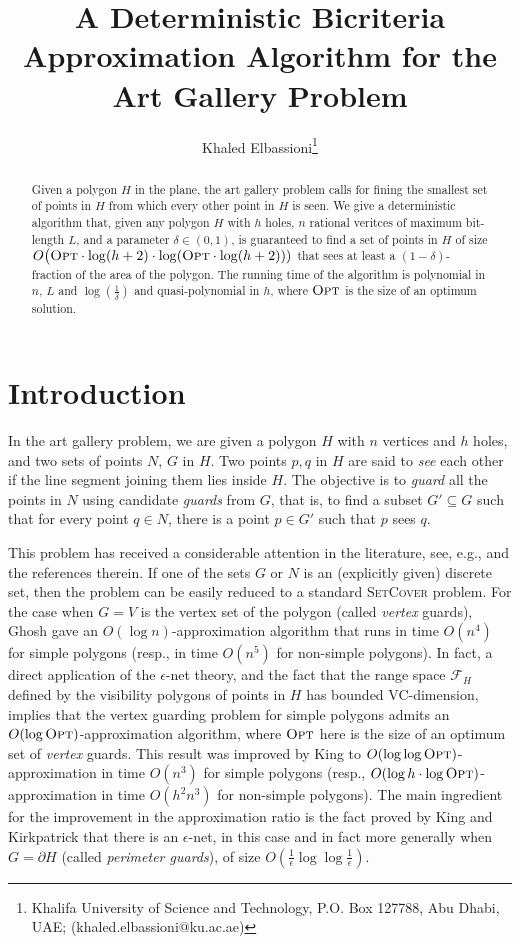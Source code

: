 \documentclass[a4paper,11pt]{article}
\title{A Deterministic Bicriteria Approximation Algorithm for  the Art Gallery Problem
}
\author{
	Khaled Elbassioni\thanks{Khalifa University of Science and Technology, P.O. Box 127788, Abu Dhabi, UAE;
		(khaled.elbassioni@ku.ac.ae)}
}
\date{}
\def\cF{\mathcal F}
\def \OPT {\textsc{Opt}}
\begin{document}
	
\maketitle


\begin{abstract}
 Given a polygon $H$ in the plane, the art gallery problem calls for fining the smallest set of points in  $H$ from which every other point in $H$ is seen. We give a deterministic algorithm that, given any polygon $H$ with $h$ holes, $n$ rational veritces of maximum bit-length $L$, and a parameter $\delta \in(0,1)$, is guaranteed to find a set of points in $H$ of size $O\big(\OPT\cdot\log(h+2)\cdot\log (\OPT\cdot\log(h+2)))$ that sees at least a  $(1-\delta)$-fraction of the area of the polygon. The running time of the algorithm is polynomial in $n$, $L$ and $\log(\frac{1}{\delta})$ and quasi-polynomial in $h$, where $\OPT$ is the size of an optimum solution.
\end{abstract}

\section{Introduction}

In the art gallery problem, we are given a polygon $H$ with $n$ vertices and  $h$ holes, and two sets of points $N$, $G$ in $H$. 
Two points $p,q$ in $H$ are said to {\it see} each other if the line segment joining them lies inside $H$. The objective is to {\it guard} all the points in $N$ using candidate {\it guards} from $G$, that is, to 
find a subset $G'\subseteq G$ such that for every point $q\in N$, there is a point $p\in G'$ such that $p$ sees $q$.

This problem has received a considerable attention in the literature, see, e.g., \cite{BCKO08,O87} and the references therein. If one of the sets $G$ or $N$ is an (explicitly given) discrete set, then the problem can be easily reduced to a standard \textsc{SetCover} problem. For the case when $G=V$ is the vertex set of the polygon (called {\it vertex} guards), Ghosh \cite{G87, G10} gave an $O(\log n)$-approximation algorithm that runs in time $O(n^4)$ for simple polygons (resp., in time $O(n^5)$ for non-simple polygons). In fact, a direct application of the $\epsilon$-net theory, and the fact that the range space $\cF_H$ defined by the visibility polygons of points in $H$ has bounded VC-dimension, implies that the vertex guarding problem for simple polygons admits an $O(\log\OPT)$-approximation algorithm, where $\OPT$ here is the size of an optimum set of {\it vertex} guards.  This result was improved by King \cite{K13} to $O(\log\log\OPT)$-approximation in time $O(n^3)$ for simple polygons (resp.,  $O(\log h\cdot\log\OPT)$-approximation in time $O(h^2n^3)$ for non-simple polygons). The main ingredient for the improvement in the approximation ratio is the fact proved by King and Kirkpatrick \cite{KK11} that there is an $\epsilon$-net, in this case and in fact more generally when $G=\partial H$ (called {\it perimeter guards}), of size $O(\frac{1}{\epsilon}\log\log \frac{1}{\epsilon})$. 
\end{document}
